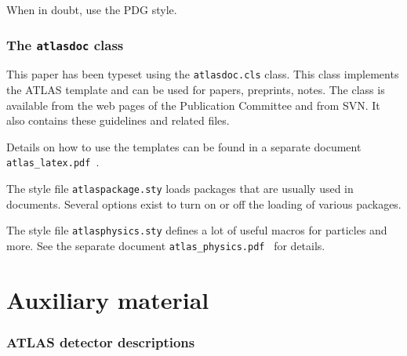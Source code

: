 \documentclass[PAPER,UKenglish]{latex/atlasdoc}
\newcommand{\File}[1]{\texttt{#1}\xspace}
\begin{document}
When in doubt, use the PDG style.


\section{The \texttt{atlasdoc} class}
\label{sec:atlasdoc}

This paper has been typeset using the \texttt{atlasdoc.cls} class.
This class implements the ATLAS template and can be used for papers, preprints,
notes. The class is available from the web pages of the
Publication Committee and from SVN.
It also contains these guidelines and related files.

Details on how to use the templates can be found in a separate document
\texttt{atlas\_latex.pdf}~\cite{atlas-latex}.

The style file \File{atlaspackage.sty} loads packages that are usually used in documents.
Several options exist to turn on or off the loading of various packages.

The style file \texttt{atlasphysics.sty} defines a lot of useful
macros for particles and more. See the separate document
\texttt{atlas\_physics.pdf}~\cite{atlas-physics} for details.


\printbibliography
% 
% 


\clearpage
\appendix
\part*{Auxiliary material}


\section{ATLAS detector descriptions}
\label{app:atlasdet}
\end{document}
